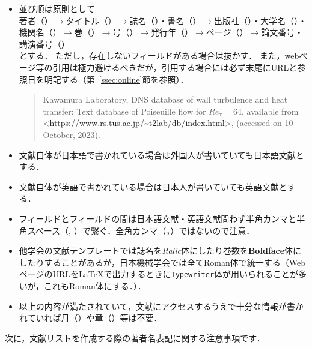 \documentclass[a4paper,fleqn,uplatex,dvipdfmx]{jsarticle}
\begin{document}
\begin{itembox}[l]{}
    \begin{itemize}
        \item 並び順は原則として \\
            著者（\ttauthor）$\to$タイトル（\tttitle）$\to$誌名（\ttjournal）・書名（\ttbooktitle）$\to$出版社（\ttpublisher）・大学名（\ttschool）・機関名（\ttinstitution）$\to$巻（\ttvolume）$\to$号（\ttnumber）$\to$発行年（\ttyear）$\to$ページ（\ttpages）$\to$論文番号・講演番号（\ttnote） \\
            とする．
            ただし，存在しないフィールドがある場合は抜かす．
            また，webページ等の引用は極力避けるべきだが，引用する場合には必ず末尾にURLと参照日を明記する（第~\ref{ssec:online}節\ttonline を参照）．
            \begin{quote}
                Kawamura Laboratory, DNS database of wall turbulence and heat transfer: Text database of Poiseuille flow for $\mathit{Re}_\tau = 64$, available from \textless\url{https://www.rs.tus.ac.jp/~t2lab/db/index.html}\textgreater, (accessed on 10 October, 2023).
            \end{quote}
        \item 文献自体が日本語で書かれている場合は外国人が書いていても日本語文献とする．
        \item 文献自体が英語で書かれている場合は日本人が書いていても英語文献とする．
        \item フィールドとフィールドの間は日本語文献・英語文献問わず半角カンマと半角スペース（, ）で繋ぐ．全角カンマ（，）ではないので注意．
        \item 他学会の文献テンプレートでは誌名を\textit{Italic}体にしたり巻数を\textbf{Boldface}体にしたりすることがあるが，日本機械学会では全て\textrm{Roman}体で統一する（WebページのURLを\LaTeX{}で出力するときに\texttt{Typewriter}体が用いられることが多いが，これも\textrm{Roman}体にする．）．
        \item 以上の内容が満たされていて，文献にアクセスするうえで十分な情報が書かれていれば月（\ttmonth）や章（\ttchapter）等は不要．
    \end{itemize}
\end{itembox}
次に，文献リストを作成する際の著者名表記に関する注意事項です．
\renewcommand\UrlFont{\ttfamily}
\end{document}
